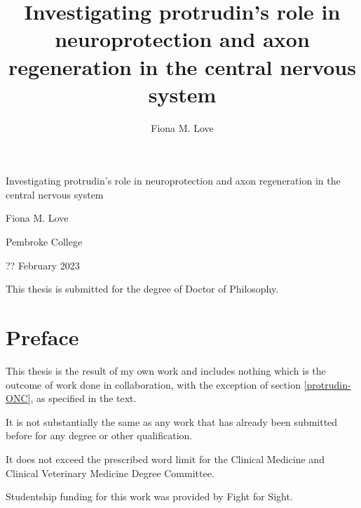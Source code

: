 \documentclass[
  12pt,
  a4paper,
]{book}
\title{Investigating protrudin's role in neuroprotection and axon regeneration in the central nervous system}
\author{Fiona M. Love}
\date{}
\begin{document}
\maketitle


\begin{titlepage}
\begin{center}

  \hspace{0pt}
  \vfill
  
  {\Huge
  Investigating protrudin's role in neuroprotection and axon regeneration in the central nervous system
  }\par
  
  {\Large
  Fiona M. Love
  }\par
  
   \vspace{1\baselineskip}
  
  {Pembroke College}\par
  {?? February 2023}\par
  
  \vspace{4\baselineskip}
  
  {This thesis is submitted for the degree of Doctor of Philosophy.}\par
  
  \vfill
  \hspace{0pt}

\end{center}
\end{titlepage}

\hypertarget{PREFACE}{%
\chapter*{Preface}\label{PREFACE}}


This thesis is the result of my own work and includes nothing which is the outcome of work done in collaboration, with the exception of section \ref{protrudin-ONC}, as specified in the text.

It is not substantially the same as any work that has already been submitted before for any degree or other qualification.

It does not exceed the prescribed word limit for the Clinical Medicine and Clinical Veterinary Medicine Degree Committee.

Studentship funding for this work was provided by Fight for Sight.
\end{document}
